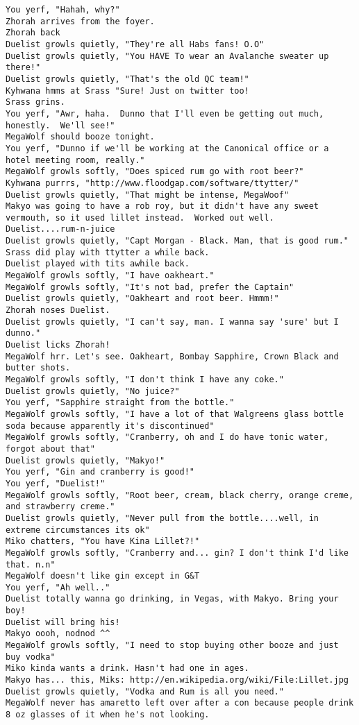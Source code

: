 \begin{verbatim}
You yerf, "Hahah, why?"
Zhorah arrives from the foyer.
Zhorah back
Duelist growls quietly, "They're all Habs fans! O.O"
Duelist growls quietly, "You HAVE To wear an Avalanche sweater up there!"
Duelist growls quietly, "That's the old QC team!"
Kyhwana hmms at Srass "Sure! Just on twitter too!
Srass grins.
You yerf, "Awr, haha.  Dunno that I'll even be getting out much, honestly.  We'll see!"
MegaWolf should booze tonight.
You yerf, "Dunno if we'll be working at the Canonical office or a hotel meeting room, really."
MegaWolf growls softly, "Does spiced rum go with root beer?"
Kyhwana purrrs, "http://www.floodgap.com/software/ttytter/"
Duelist growls quietly, "That might be intense, MegaWoof"
Makyo was going to have a rob roy, but it didn't have any sweet vermouth, so it used lillet instead.  Worked out well.
Duelist....rum-n-juice
Duelist growls quietly, "Capt Morgan - Black. Man, that is good rum."
Srass did play with ttytter a while back.
Duelist played with tits awhile back.
MegaWolf growls softly, "I have oakheart."
MegaWolf growls softly, "It's not bad, prefer the Captain"
Duelist growls quietly, "Oakheart and root beer. Hmmm!"
Zhorah noses Duelist.
Duelist growls quietly, "I can't say, man. I wanna say 'sure' but I dunno."
Duelist licks Zhorah!
MegaWolf hrr. Let's see. Oakheart, Bombay Sapphire, Crown Black and butter shots.
MegaWolf growls softly, "I don't think I have any coke."
Duelist growls quietly, "No juice?"
You yerf, "Sapphire straight from the bottle."
MegaWolf growls softly, "I have a lot of that Walgreens glass bottle soda because apparently it's discontinued"
MegaWolf growls softly, "Cranberry, oh and I do have tonic water, forgot about that"
Duelist growls quietly, "Makyo!"
You yerf, "Gin and cranberry is good!"
You yerf, "Duelist!"
MegaWolf growls softly, "Root beer, cream, black cherry, orange creme, and strawberry creme."
Duelist growls quietly, "Never pull from the bottle....well, in extreme circumstances its ok"
Miko chatters, "You have Kina Lillet?!"
MegaWolf growls softly, "Cranberry and... gin? I don't think I'd like that. n.n"
MegaWolf doesn't like gin except in G&T
You yerf, "Ah well.."
Duelist totally wanna go drinking, in Vegas, with Makyo. Bring your boy!
Duelist will bring his!
Makyo oooh, nodnod ^^
MegaWolf growls softly, "I need to stop buying other booze and just buy vodka"
Miko kinda wants a drink. Hasn't had one in ages.
Makyo has... this, Miks: http://en.wikipedia.org/wiki/File:Lillet.jpg
Duelist growls quietly, "Vodka and Rum is all you need."
MegaWolf never has amaretto left over after a con because people drink 8 oz glasses of it when he's not looking.

\end{verbatim}
